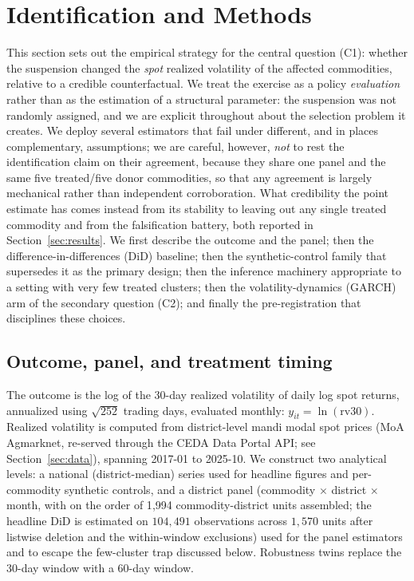 \section{Identification and Methods}
\label{sec:methodology}

This section sets out the empirical strategy for the central question (C1): whether
the suspension changed the \emph{spot} realized volatility of the affected commodities,
relative to a credible counterfactual. We treat the exercise as a policy
\emph{evaluation} rather than as the estimation of a structural parameter: the
suspension was not randomly assigned, and we are explicit throughout about the
selection problem it creates. We deploy several estimators that fail under different,
and in places complementary, assumptions; we are careful, however, \emph{not} to rest
the identification claim on their agreement, because they share one panel and the same
five treated/five donor commodities, so that any agreement is largely mechanical rather
than independent corroboration. What credibility the point estimate has comes instead
from its stability to leaving out any single treated commodity and from the
falsification battery, both reported in Section~\ref{sec:results}. We first describe the outcome
and the panel; then the difference-in-differences (DiD) baseline; then the
synthetic-control family that supersedes it as the primary design; then the inference
machinery appropriate to a setting with very few treated clusters; then the
volatility-dynamics (GARCH) arm of the secondary question (C2); and finally the
pre-registration that disciplines these choices.

\subsection{Outcome, panel, and treatment timing}

The outcome is the log of the 30-day realized volatility of daily log spot returns,
annualized using $\sqrt{252}$ trading days, evaluated monthly: $y_{it} = \ln(\mathrm{rv30})$.
Realized volatility is computed from district-level mandi modal spot prices
(MoA Agmarknet, re-served through the CEDA Data Portal API; see Section~\ref{sec:data}),
spanning 2017-01 to 2025-10. We construct two analytical levels: a national
(district-median) series used for headline figures and per-commodity synthetic
controls, and a district panel (commodity $\times$ district $\times$ month, with on the
order of 1{,}994 commodity-district units assembled; the headline DiD is estimated on
$104{,}491$ observations across $1{,}570$ units after listwise deletion and the
within-window exclusions) used for the panel estimators and to escape the few-cluster
trap discussed below. Robustness twins replace the 30-day window with a
60-day window.

